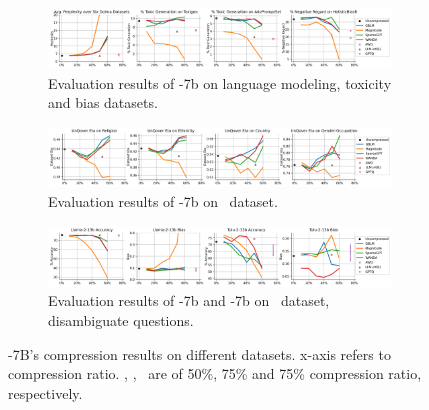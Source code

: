 \begin{figure}[!t]
    \begin{subfigure}{\linewidth}
    \includegraphics[width=\linewidth]{figures/A1a.png}
    \caption{Evaluation results of -7b on language modeling, toxicity and bias datasets.}
    \label{subfig:llama2_7b_generative}
    \end{subfigure}

    \begin{subfigure}{\linewidth}
    \includegraphics[width=\linewidth]{figures/A1b.png}
    \caption{Evaluation results of -7b on \unqover~dataset.}
    \label{subfig:llama2_7b_unqover}
    \end{subfigure}

    \begin{subfigure}{\linewidth}
    \includegraphics[width=\linewidth]{figures/A1c.png}
    \caption{Evaluation results of -7b and -7b on \bbq~dataset, disambiguate questions.}
    \label{subfig:llama_tulu2_7b_bbq}
    \end{subfigure}
    \caption{-7B's compression results on different datasets. x-axis refers to compression ratio. \bitsandbytes, \awq, \gptq~are of 50\%, 75\% and 75\% compression ratio, respectively.}
    \label{fig:llama2_7b_comprehensive}
\end{figure}

